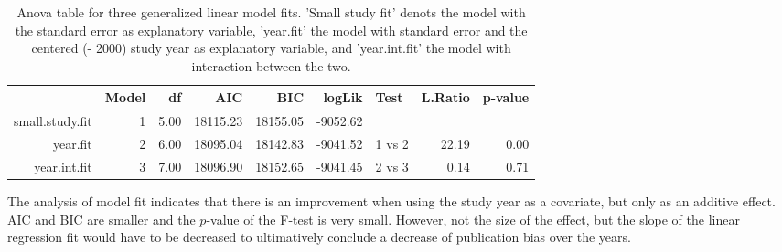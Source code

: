 \documentclass[11pt,a4paper,twoside]{book}\usepackage[]{graphicx}\usepackage[]{color}
\begin{document}
\begin{table}[ht]
\centering
\begingroup\scriptsize
\begin{tabular}{rrrrrrlrr}
  \hline
 & Model & df & AIC & BIC & logLik & Test & L.Ratio & p-value \\ 
  \hline
small.study.fit &   1 & 5.00 & 18115.23 & 18155.05 & -9052.62 &  &  &  \\ 
  year.fit &   2 & 6.00 & 18095.04 & 18142.83 & -9041.52 & 1 vs 2 & 22.19 & 0.00 \\ 
  year.int.fit &   3 & 7.00 & 18096.90 & 18152.65 & -9041.45 & 2 vs 3 & 0.14 & 0.71 \\ 
   \hline
\end{tabular}
\endgroup
\caption{Anova table for three generalized linear model fits. 'Small study fit' denots the model with the standard error as explanatory variable, 'year.fit' the model with standard error and the centered (- 2000) study year as explanatory variable, and 'year.int.fit' the model with interaction between the two.} 
\label{anova.lme}
\end{table}


The analysis of model fit indicates that there is an improvement when using the study year as a covariate, but only as an additive effect. AIC and BIC are smaller and the $p$-value of the F-test is very small. However, not the size of the effect, but the slope of the linear regression fit would have to be decreased to ultimatively conclude a decrease of publication bias over the years. 
\end{document}

